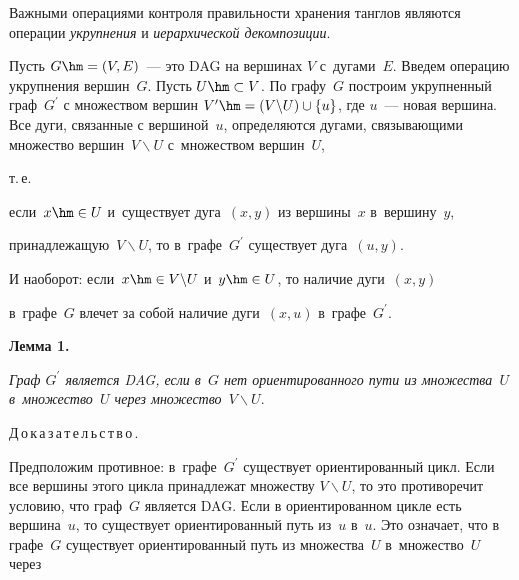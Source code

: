   


  Важными операциями контроля правильности хранения танглов являются операции \textit{укрупнения} и \textit{иерархической декомпозиции}.


   


  Пусть $G \hm= (V, E)$~--- это DAG на вершинах $V$ с~дугами~$E$. Введем операцию укрупнения вершин~$G$. Пусть $U\hm\subset V$. По графу~$G$ построим укрупненный граф~$G^\prime$ с множеством вершин $V^\prime\hm= (V\backslash U)\cup \{u\}$, где $u$~--- новая вершина. Все дуги, связанные с вершиной~$u$, определяются дугами, связывающими множество вершин~$ V\backslash U $ с~множеством вершин~$U$,


  т.\,е.\ 


  если~$x\hm\in U$ и~существует дуга~$ (x, y)$ из вершины~$x$ в~вершину~$y$, 


  принадлежащую~$V\backslash U$, то в~графе~$G^\prime$ существует дуга~$(u, y)$. 


  И наоборот: если~$x\hm\in V\backslash U$ и~$y\hm\in U$, то наличие дуги~$(x, y)$ 


  в~графе~$G$ влечет за собой наличие дуги~$(x, u)$ в~графе~$G^\prime$. 


  


  \smallskip


  


  \noindent


  \textbf{Лемма 1.}\


  \textit{Граф $G^\prime$ является DAG, если в~$G$ нет ориентированного пути из множества~$U$ в~множество~$U$ через множество~$ V\backslash U$}.


  


  \smallskip


  


  \noindent


  Д\,о\,к\,а\,з\,а\,т\,е\,л\,ь\,с\,т\,в\,о\,.\ \ 


  Предположим противное: в~графе~$G^\prime$ существует ориентированный цикл. Если все вершины этого цикла принадлежат множеству $ V\backslash U$, то это противоречит условию, что граф~$G$ является DAG. Если в ориентированном цикле есть вершина~$u$, то существует ориентированный путь из~$u$ в~$u$. Это означает, что в графе~$G$ существует ориентированный путь из множества~$U$ в~множество~$U$ через 


